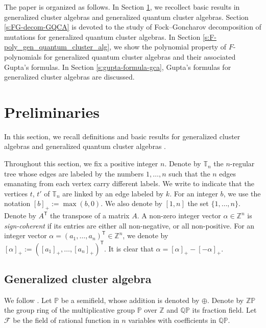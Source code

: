 \documentclass[10pt,a4paper]{amsart}
\newcommand{\Z}{\mathbb{Z}}
\numberwithin{equation}{section}
\begin{document}
The paper is organized as follows. In Section \ref{Preliminaries}, we recollect basic results in generalized cluster algebras and generalized quantum cluster algebras. Section \ref{s:FG-decom-GQCA} is devoted to the study of Fock--Goncharov decomposition of mutations for generalized quantum cluster algebras. In Section \ref{s:F-poly_gen_quantum_cluster_alg}, we show the polynomial property of $F$-polynomials for generalized quantum cluster algebras and their associated Gupta's formulas. In Section \ref{s:gupta-formula-gca}, Gupta's formulas for generalized cluster algebras are discussed.

 \section{Preliminaries}\label{Preliminaries}
 In this section, we recall definitions and basic results for generalized cluster algebras \cite{Chekhov_Shapiro} and generalized quantum cluster algebras \cite{BCDX2018}.

 Throughout this section, we fix a positive integer $n$. Denote by $\mathbb{T}_n$ the $n$-regular tree whose edges are labeled by the numbers $1,\dots,n$ such that the $n$ edges emanating from each vertex carry different labels. We write
  to indicate that the vertices $t$, $t'$ of $\mathbb{T}_n$ are linked by an edge labeled by $k$.
For an integer $b$, we use the notation $[b]_+:=\max(b,0)$. We also denote by $[1,n]$ the set $\{1,\dots,n\}$. Denote by $A^{\mathsf T}$ the transpose of a matrix $A$. A non-zero integer vector $\alpha\in \Z^n$ is {\it sign-coherent} if its entries are either all non-negative, or all non-positive.
For an integer vector $\alpha=(a_1,\dots,a_n)^{\mathsf T}\in\mathbb{Z}^n$, we denote by $[\alpha]_+:=([a_1]_+,\dots,[a_n]_+)^{\mathsf T}$. It is clear that $\alpha=[\alpha]_+-[-\alpha]_+$.

\subsection{Generalized cluster algebra}\label{S2}
 We follow \cite{Nakanishi14}.
Let $\mathbb{P}$ be a semifield, whose addition is denoted by $\oplus$. Denote by $\mathbb{ZP}$ the group ring of the multiplicative group $\mathbb{P}$ over $\mathbb{Z}$ and $\mathbb{QP}$ its fraction field. Let
$\mathcal{F}$ be the field of rational function in $n$ variables with coefficients in $\mathbb{QP}$.
\end{document}
